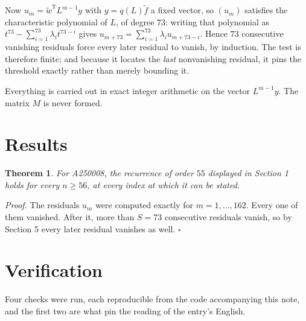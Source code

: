 \documentclass[11pt]{article}
\newtheorem{theorem}{Theorem}
\theoremstyle{definition}
\begin{document}
Now $u_m = \tilde w^{\mathsf T} L^{m-1} y$ with $y = q(L)\tilde f$ a fixed vector, so $(u_m)$ satisfies the characteristic polynomial of $L$, of degree $73$: writing that polynomial as $t^{73} - \sum_{i=1}^{73} \lambda_i t^{73-i}$ gives $u_{m+73} = \sum_{i=1}^{73} \lambda_i u_{m+73-i}$. Hence $73$ consecutive vanishing residuals force every later residual to vanish, by induction. The test is therefore finite; and because it locates the {\itshape last} nonvanishing residual, it pins the threshold exactly rather than merely bounding it.

Everything is carried out in exact integer arithmetic on the vector $L^{m-1}y$. The matrix $M$ is never formed.

\section{Results}

\begin{theorem} For A250008, the recurrence of order $55$ displayed in Section 1 holds for every $n \ge 56$, at every index at which it can be stated.\end{theorem}

{\itshape Proof.} The residuals $u_m$ were computed exactly for $m = 1,\dots,162$. Every one of them vanished. After it, more than $S = 73$ consecutive residuals vanish, so by Section 5 every later residual vanishes as well. $\square$

\section{Verification}

Four checks were run, each reproducible from the code accompanying this note, and the first two are what pin the reading of the entry's English.
\end{document}
